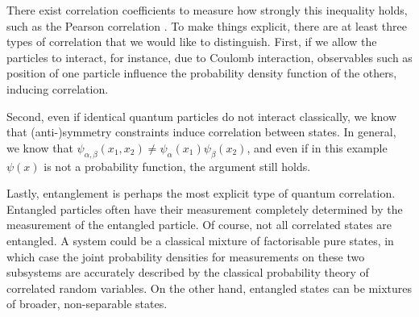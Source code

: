 There exist correlation coefficients to measure how strongly this inequality holds, such as the Pearson correlation \cite{sedgwick2012pearson}. To make things explicit, there are at least three types of correlation that we would like to distinguish. First, if we allow the particles to interact, for instance, due to Coulomb interaction, observables such as position of one particle influence the probability density function of the others, inducing correlation.


Second, even if identical quantum particles do not interact classically, we know that (anti-)symmetry constraints induce correlation between states. In general, we know that $ \psi_{\alpha,\beta}(x_1,x_2) \neq\psi_\alpha(x_1)\psi_\beta(x_2)$, and even if in this example $\psi(x)$ is not a probability function, the argument still holds.

Lastly, entanglement is perhaps the most explicit type of quantum correlation. Entangled particles often have their measurement completely determined by the measurement of the entangled particle. Of course, not all correlated states are entangled. A system could be a classical mixture of factorisable pure states, in which case the joint probability densities for measurements on these two subsystems are accurately described by the classical probability theory of correlated random variables. On the other hand, entangled states can be mixtures of broader, non-separable states.